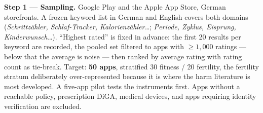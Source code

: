 \documentclass[10pt,a4paper]{article}
\begin{document}
\begin{figure}[h]
\centering
{}
\end{figure}

\textbf{Step 1 --- Sampling.} Google Play and the Apple App Store, German
storefronts. A frozen keyword list in German and English covers both domains
(\emph{Schrittzähler, Schlaf-Tracker, Kalorienzähler\dots}; \emph{Periode,
Zyklus, Eisprung, Kinderwunsch\dots}). \enquote{Highest rated} is fixed in
advance: the first 20 results per keyword are recorded, the pooled set filtered
to apps with $\geq 1{,}000$ ratings --- below that the average is noise --- then
ranked by average rating with rating count as tie-break. Target: \textbf{50
apps}, stratified 30 fitness / 20 fertility, the fertility stratum deliberately
over-represented because it is where the harm literature is most developed. A
five-app pilot tests the instruments first. Apps without a reachable policy,
prescription DiGA, medical devices, and apps requiring identity verification are
excluded.
\end{document}
